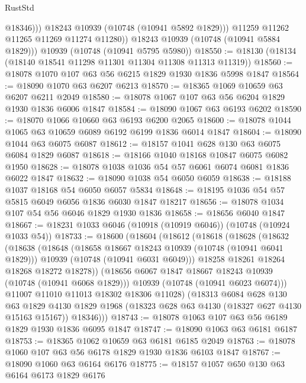 \begin{lexlean}{RustStd}
\begin{coremodule}
{\begin{coremodule}
{{{{{                  @18346)))
            @18243
            @10939
            (@10748 (@10941 @5892 @1829)))
          @11259
          @11262
          @11265
          @11269
          @11274
          @11280))
      @18243
      @10939
      (@10748 (@10941 @5884 @1829)))
    @10939
    (@10748 (@10941 @5795 @5980))
@18550 := @18130 (@18134 (@18140 @18541 @11298 @11301 @11304 @11308 @11313 @11319))
@18560 := @18078 @1070 @107 @63 @56 @6215 @1829 @1930 @1836 @5998 @1847
@18564 := @18090 @1070 @63 @6207 @6213
@18570 := @18365 @1069 @10659 @63 @6207 @6211 @2049
@18580 := @18078 @1067 @107 @63 @56 @6204 @1829 @1930 @1836 @6006 @1847
@18584 := @18090 @1067 @63 @6193 @6202
@18590 := @18070 @1066 @10660 @63 @6193 @6200 @2065
@18600 := @18078 @1044 @1065 @63 @10659 @6089 @6192 @6199 @1836 @6014 @1847
@18604 := @18090 @1044 @63 @6075 @6087
@18612 := @18157 @1041 @628 @130 @63 @6075 @6084 @1829 @6087
@18618 := @18166 @1040 @18168 @10847 @6075 @6082 @1950
@18628 := @18078 @1038 @1036 @54 @57 @6061 @6074 @6081 @1836 @6022 @1847
@18632 := @18090 @1038 @54 @6050 @6059
@18638 := @18188 @1037 @18168 @54 @6050 @6057 @5834
@18648 := @18195 @1036 @54 @57 @5815 @6049 @6056 @1836 @6030 @1847 @18217
@18656 := @18078 @1034 @107 @54 @56 @6046 @1829 @1930 @1836
@18658 := @18656 @6040 @1847
@18667 := @18231 @1033 @6046 (@10918 (@10919 @6046)) (@10748 (@10924 @1033 @54))
@18733 := @18600
    (@18604
      (@18612
        (@18618
          (@18628
            (@18632
              (@18638
                (@18648
                  (@18658 @18667 @18243 @10939 (@10748 (@10941 @6041 @1829)))
                  @10939
                  (@10748 (@10941 @6031 @6049)))
                @18258
                @18261
                @18264
                @18268
                @18272
                @18278))
            (@18656 @6067 @1847 @18667 @18243 @10939 (@10748 (@10941 @6068 @1829)))
            @10939
            (@10748 (@10941 @6023 @6074)))
          @11007
          @11010
          @11013
          @18302
          @18306
          @11028)
        (@18313
          @6084
          @628
          @130
          @63
          @1829
          @4130
          @1829
          @1968
          (@18323 @628 @63 @4130 (@18327 @627 @4130 @15163 @15167))
          @18346)))
@18743 := @18078 @1063 @107 @63 @56 @6189 @1829 @1930 @1836 @6095 @1847
@18747 := @18090 @1063 @63 @6181 @6187
@18753 := @18365 @1062 @10659 @63 @6181 @6185 @2049
@18763 := @18078 @1060 @107 @63 @56 @6178 @1829 @1930 @1836 @6103 @1847
@18767 := @18090 @1060 @63 @6164 @6176
@18775 := @18157 @1057 @650 @130 @63 @6164 @6173 @1829 @6176
}}}}}
\end{coremodule}}
\end{coremodule}
\end{lexlean}
